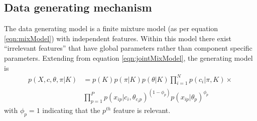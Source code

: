 \documentclass{bioinfo}
\begin{document}
\begin{methods}
\subsection{Data generating mechanism}
%

The data generating model is a finite mixture model (as per equation \ref{eqn:mixModel}) with independent features. Within this model there exist ``irrelevant features'' \citep{law2003feature} that have global parameters rather than component specific parameters. Extending from equation \ref{eqn:jointMixModel}, the generating model is
\begin{align*}
p(X, c, \theta, \pi| K) &= p(K) p(\pi| K) p(\theta|K) \prod_{i=1}^N p (c_i | \pi, K)  \times \\
  & \prod_{p=1}^P p(x_{ip} | c_i, \theta_{c_ip})^{(1 - \phi_p)} p(x_{ip} | \theta_p) ^ {\phi_p}
\end{align*}
with $\phi_p=1$ indicating that the $p^{th}$ feature is relevant. 


\end{methods}
\end{document}
